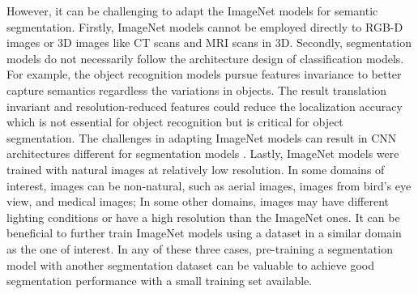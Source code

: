 However, it can be challenging to adapt the ImageNet models for semantic segmentation.
Firstly, ImageNet models cannot be employed directly to RGB-D images or 3D images like CT scans and MRI scans in 3D.
Secondly, segmentation models do not necessarily follow the architecture design of classification models.
For example, the object recognition models pursue features invariance to better capture semantics regardless the variations in objects.
The result translation invariant and resolution-reduced features could reduce the localization accuracy which is not essential for object recognition but is critical for object segmentation. \cite{zheng2015conditional,chen2016deeplab}
The challenges in adapting ImageNet models can result in CNN architectures different for segmentation models \cite{zheng2015conditional}.
Lastly, ImageNet models were trained with natural images at relatively low resolution.
In some domains of interest, images can be non-natural, such as aerial images, images from bird's eye view, and medical images;
In some other domains, images may have different lighting conditions or have a high resolution than the ImageNet ones.
It can be beneficial to further train ImageNet models using a dataset in a similar domain as the one of interest.
In any of these three cases, pre-training a segmentation model with another segmentation dataset can be valuable to achieve good segmentation performance with a small training set available.





